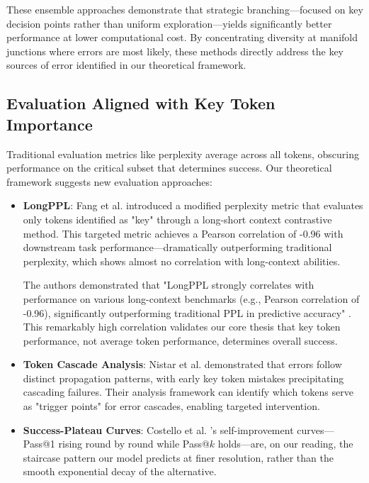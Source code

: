 \documentclass{article}
\begin{document}
These ensemble approaches demonstrate that strategic branching—focused on key decision points rather than uniform exploration—yields significantly better performance at lower computational cost. By concentrating diversity at manifold junctions where errors are most likely, these methods directly address the key sources of error identified in our theoretical framework.

\subsection{Evaluation Aligned with Key Token Importance}

Traditional evaluation metrics like perplexity average across all tokens, obscuring performance on the critical subset that determines success. Our theoretical framework suggests new evaluation approaches:

\begin{itemize}
\item \textbf{LongPPL}: Fang et al. \citep{fang2024what} introduced a modified perplexity metric that evaluates only tokens identified as "key" through a long-short context contrastive method. This targeted metric achieves a Pearson correlation of -0.96 with downstream task performance—dramatically outperforming traditional perplexity, which shows almost no correlation with long-context abilities.

  The authors demonstrated that "LongPPL strongly correlates with performance on various long-context benchmarks (e.g., Pearson correlation of -0.96), significantly outperforming traditional PPL in predictive accuracy" \citep{fang2024what}. This remarkably high correlation validates our core thesis that key token performance, not average token performance, determines overall success.

\item \textbf{Token Cascade Analysis}: Nistar et al. \citep{nistar2024token} demonstrated that errors follow distinct propagation patterns, with early key token mistakes precipitating cascading failures. Their analysis framework can identify which tokens serve as "trigger points" for error cascades, enabling targeted intervention.

\item \textbf{Success-Plateau Curves}: Costello et al. \citep{costello2025think}'s self-improvement curves---Pass@1 rising round by round while Pass@$k$ holds---are, on our reading, the staircase pattern our model predicts at finer resolution, rather than the smooth exponential decay of the alternative.
\end{itemize}
\end{document}
